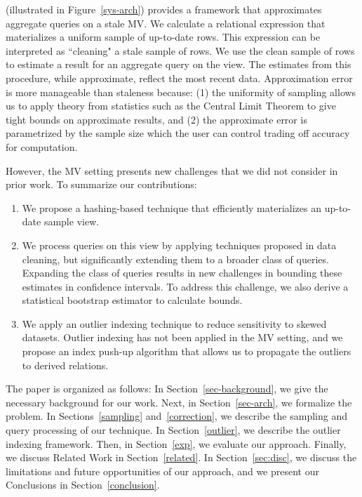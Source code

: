 \svcfull (\svc illustrated in Figure~\ref{sys-arch}) provides a framework that approximates aggregate queries on a stale MV.
We calculate a relational expression that materializes a uniform sample of up-to-date rows.
This expression can be interpreted as ``cleaning" a stale sample of rows.
We use the clean sample of rows to estimate a result for an aggregate query on the view.
The estimates from this procedure, while approximate, reflect the most recent data. 
Approximation error is more manageable than staleness because: (1) the uniformity of sampling allows us to apply theory from statistics such as the Central Limit Theorem to give tight bounds on approximate results, and (2) the approximate error is parametrized by the sample size which the user can control trading off accuracy for computation.

However, the MV setting presents new challenges that we did not consider in prior work.
To summarize our contributions:
\begin{enumerate}[noitemsep]
\item We propose a hashing-based technique that efficiently materializes an up-to-date sample view.
\item We process queries on this view by applying techniques proposed in data cleaning, but significantly extending them to a broader class of queries. Expanding the class of queries results in new challenges in bounding these estimates in confidence intervals. To address this challenge, we also derive a statistical bootstrap estimator to calculate bounds.
\item We apply an outlier indexing technique to reduce sensitivity to skewed datasets. Outlier indexing has not been applied in the MV setting, and we propose an index push-up algorithm that allows us to propagate the outliers to derived relations.
\end{enumerate} 

The paper is organized as follows: 
In Section~\ref{sec-background}, we give the necessary background for our work.
Next, in Section~\ref{sec-arch}, we formalize the problem.
In Sections~\ref{sampling} and~\ref{correction}, we describe the sampling and query processing of our technique.
In Section~\ref{outlier}, we describe the outlier indexing framework.
Then, in Section~\ref{exp}, we evaluate our approach.
Finally, we discuss Related Work in Section~\ref{related}.
In Section~\ref{sec:disc}, we discuss the limitations and future opportunities of our approach, and we present our Conclusions in Section~\ref{conclusion}.
